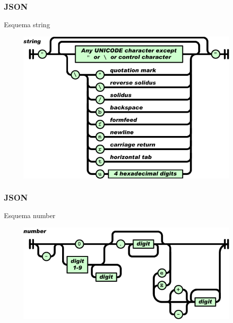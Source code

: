 \documentclass{beamer}
\begin{document}
\begin{frame}
\frametitle{JSON}
\begin{block}{Esquema string}
\begin{figure}
\includegraphics[width=0.7\linewidth]{string.png}
\end{figure}
\end{block}

\end{frame}



\begin{frame}
\frametitle{JSON}
\begin{block}{Esquema number}
\begin{figure}
\includegraphics[width=0.7\linewidth]{number.png}
\end{figure}
\end{block}

\end{frame}
\end{document}
